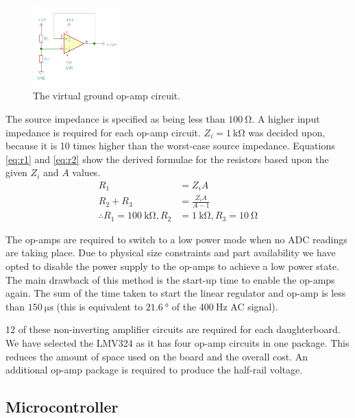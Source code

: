 \documentclass[12pt]{article}
\begin{document}
\begin{figure}[H]
	\centering
	\includegraphics[width=0.3\textwidth]{virtual_ground_circuit}
	\caption{The virtual ground op-amp circuit.}
	\label{fig:half-supply}
\end{figure}

The source impedance is specified as being less than $\SI{100}{\ohm}$.
A higher input impedance is required for each op-amp circuit.
$Z_i = \SI{1}{\kilo\ohm}$ was decided upon, because it is 10 times higher than the worst-case source impedance.
Equations \ref{eq:r1} and \ref{eq:r2} show the derived formulae for the resistors based upon the given $Z_i$ and $A$ values.
\begin{align}
	R_1 &= Z_i A \label{eq:r1} \\
	R_2 + R_3 &= \frac{Z_i A}{A - 1} \label{eq:r2} \\[1em]
	\therefore R_1 = \SI{100}{\kilo\ohm}, R_2 &= \SI{1}{\kilo\ohm}, R_3 = \SI{10}{\ohm} \nonumber
\end{align}

The op-amps are required to switch to a low power mode when no ADC readings are taking place.
Due to physical size constraints and part availability we have opted to disable the power supply to the op-amps to achieve a low power state.
The main drawback of this method is the start-up time to enable the op-amps again.
The sum of the time taken to start the linear regulator and op-amp is less than $\SI{150}{\micro\second}$ (this is equivalent to $\SI{21.6}{\degree}$ of the $\SI{400}{\hertz}$ AC signal).

12 of these non-inverting amplifier circuits are required for each daughterboard.
We have selected the LMV324 as it has four op-amp circuits in one package.
This reduces the amount of space used on the board and the overall cost.
An additional op-amp package is required to produce the half-rail voltage.

\subsection{Microcontroller}
\end{document}
